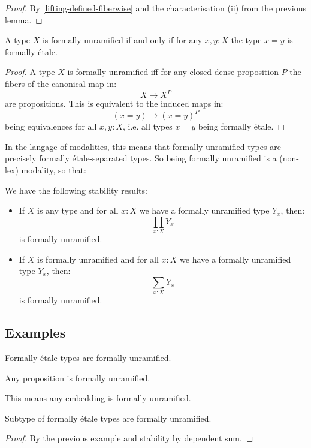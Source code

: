 \begin{proof}
By \cref{lifting-defined-fiberwise} and the characterisation (ii) from the previous lemma.
\end{proof}

\begin{lemma}
A type $X$ is formally unramified if and only if for any $x,y:X$ the type $x=y$ is formally étale.
\end{lemma}
\begin{proof}
A type $X$ is formally unramified iff for any closed dense proposition $P$ the fibers of the canonical map in:
\[X\to X^P\]
are propositions. This is equivalent to the induced maps in:
\[(x=y)\to (x=y)^P\]
being equivalences for all $x,y:X$, i.e. all types $x=y$ being formally étale.
\end{proof}

In the langage of modalities, this means that formally unramified types are precisely formally étale-separated types. So being formally unramified is a (non-lex) modality, so that:

\begin{proposition}
We have the following stability results:
\begin{itemize}
\item If $X$ is any type and for all $x:X$ we have a formally unramified type $Y_x$, then:
\[\prod_{x:X}Y_x\]
is formally unramified. 
\item  If $X$ is formally unramified and for all $x:X$ we have a formally unramified type $Y_x$, then:
\[\sum_{x:X}Y_x\]
is formally unramified.
\end{itemize}
\end{proposition}

\subsection{Examples}

Formally étale types are formally unramified.

\begin{proposition}
Any proposition is formally unramified.
\end{proposition}

This means any embedding is formally unramified.

\begin{proposition}
Subtype of formally étale types are formally unramified.
\end{proposition}

\begin{proof}
By the previous example and stability by dependent sum.
\end{proof}

